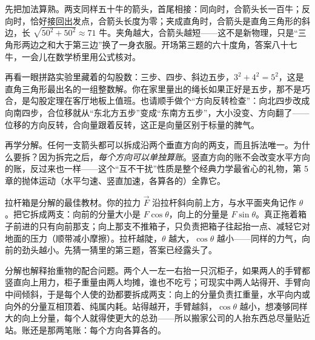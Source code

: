 \begin{mainline}
先把加法算熟。两支同样五十牛的箭头，首尾相接：同向时，合箭头长一百牛；反向时，恰好接回出发点，合箭头长度为零；夹成直角时，合箭头是直角三角形的斜边，长 \(\sqrt{50^{2}+50^{2}}\approx 71\) 牛。夹角越大，合箭头越短——这不是新物理，只是“三角形两边之和大于第三边”换了一身衣服。开场第三题的六十度角，答案八十七牛，一会儿在数学桥里用公式核对。

再看一眼拼路实验里藏着的勾股数：三步、四步、斜边五步，\(3^{2}+4^{2}=5^{2}\)，这是直角三角形最出名的一组整数解。你在家里量出的绳长如果正好是五步，那不是巧合，是勾股定理在客厅地板上值班。也请顺手做个“方向反转检查”：向北四步改成向南四步，合位移就从“东北方五步”变成“东南方五步”，大小没变、方向翻了——位移的方向反转，合向量跟着反转，这正是向量区别于标量的脾气。

再学分解。任何一支箭头都可以拆成沿两个垂直方向的两支，而且拆法唯一。为什么要拆？因为拆完之后，\emph{每个方向可以单独算账}。竖直方向的账不会改变水平方向的账，反过来也一样——这个“互不干扰”性质是整个经典力学最省心的礼物，第 5 章的抛体运动（水平匀速、竖直加速，各算各的）全靠它。

拉杆箱是分解的最佳教材。你的拉力 \(\vec{F}\) 沿拉杆斜向前上方，与水平面夹角记作 \(\theta\)。把它拆成两支：向前的分量大小是 \(F\cos\theta\)，向上的分量是 \(F\sin\theta\)。真正拖着箱子前进的只有向前那支；向上那支不推箱子，只负责把箱子往起抬一点、减轻它对地面的压力（顺带减小摩擦）。拉杆越陡，\(\theta\) 越大，\(\cos\theta\) 越小——同样的力气，向前的劲头越小。先猜一猜里的第三题，答案已经露头了。

分解也解释抬重物的配合问题。两个人一左一右抬一只沉柜子，如果两人的手臂都竖直向上用力，柜子重量由两人均摊，谁也不吃亏；可现实中两人站得开、手臂向中间倾斜，于是每个人使的劲都要拆成两支：向上的分量负责扛重量，水平向内或向外的分量互相顶着、纯属内耗。站得越开，手臂越斜，\(\cos\theta\) 越小，想凑够同样大的向上分量，每个人就得使更大的总劲——所以搬家公司的人抬东西总尽量贴近站。账还是那两笔账：每个方向各算各的。
\end{mainline}

\begin{center}
\end{center}

